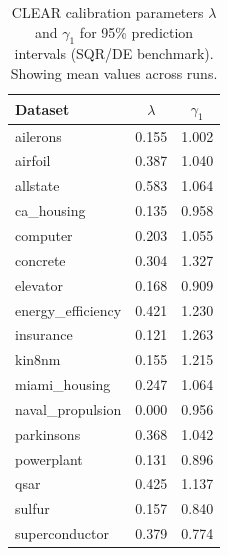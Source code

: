 \begin{table}[!htbp]
\centering
\caption{CLEAR calibration parameters $\lambda$ and $\gamma_1$ for 95\% prediction intervals (SQR/DE benchmark). Showing mean values across runs.}
\label{tab:de_sqr_calibration_95}
\small
\begin{tabular}{lcc}
\toprule
Dataset & $\lambda$ & $\gamma_1$ \\
\midrule
ailerons & 0.155 & 1.002 \\
airfoil & 0.387 & 1.040 \\
allstate & 0.583 & 1.064 \\
ca\_housing & 0.135 & 0.958 \\
computer & 0.203 & 1.055 \\
concrete & 0.304 & 1.327 \\
elevator & 0.168 & 0.909 \\
energy\_efficiency & 0.421 & 1.230 \\
insurance & 0.121 & 1.263 \\
kin8nm & 0.155 & 1.215 \\
miami\_housing & 0.247 & 1.064 \\
naval\_propulsion & 0.000 & 0.956 \\
parkinsons & 0.368 & 1.042 \\
powerplant & 0.131 & 0.896 \\
qsar & 0.425 & 1.137 \\
sulfur & 0.157 & 0.840 \\
superconductor & 0.379 & 0.774 \\
\bottomrule
\end{tabular}
\end{table}